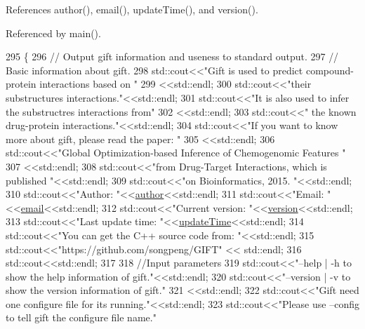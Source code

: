 References author(), email(), update\+Time(), and version().



Referenced by main().


\begin{DoxyCode}
295                 \{
296     \textcolor{comment}{// Output gift information and useness to standard output.}
297     \textcolor{comment}{// Basic information about gift.}
298     std::cout<<\textcolor{stringliteral}{"Gift is used to predict compound-protein interactions based on "}
299              <<std::endl;
300     std::cout<<\textcolor{stringliteral}{"their substructures interactions."}<<std::endl;
301     std::cout<<\textcolor{stringliteral}{"It is also used to infer the substructres interactions from"}
302              <<std::endl;
303     std::cout<<\textcolor{stringliteral}{" the known drug-protein interactions."}<<std::endl;
304     std::cout<<\textcolor{stringliteral}{"If you want to know more about gift, please read the paper: "}
305              <<std::endl;
306     std::cout<<\textcolor{stringliteral}{"Global Optimization-based Inference of Chemogenomic Features "}
307              <<std::endl;
308     std::cout<<\textcolor{stringliteral}{"from Drug-Target Interactions, which is published  "}<<std::endl;
309     std::cout<<\textcolor{stringliteral}{"on Bioinformatics, 2015. "}<<std::endl;
310     std::cout<<\textcolor{stringliteral}{"Author: "}<<\hyperlink{namespacegift_a808b6e0e19d275854aa787f2eac4df98}{author}<<std::endl;
311     std::cout<<\textcolor{stringliteral}{"Email: "} <<\hyperlink{namespacegift_aa24ca2be91b60d3c50d6848e87233a4c}{email}<<std::endl;
312     std::cout<<\textcolor{stringliteral}{"Current version: "}<<\hyperlink{namespacegift_a5a720324a7e112ad94437108be453df3}{version}<<std::endl;
313     std::cout<<\textcolor{stringliteral}{"Last update time: "}<<\hyperlink{namespacegift_a55b20ab87c86ecd24ad1432649c32df9}{updateTime}<<std::endl;
314     std::cout<<\textcolor{stringliteral}{"You can get the C++ source code from: "}<<std::endl;
315     std::cout<<\textcolor{stringliteral}{"https://github.com/songpeng/GIFT"} << std::endl;
316     std::cout<<std::endl;
317 
318     \textcolor{comment}{//Input parameters}
319     std::cout<<\textcolor{stringliteral}{"--help | -h to show the help information of gift."}<<std::endl;
320     std::cout<<\textcolor{stringliteral}{"--version | -v to show the version information of gift."}
321              <<std::endl;
322     std::cout<<\textcolor{stringliteral}{"Gift need one configure file for its running."}<<std::endl;
323     std::cout<<\textcolor{stringliteral}{"Please use --config to tell gift the configure file name."}

\end{DoxyCode}
